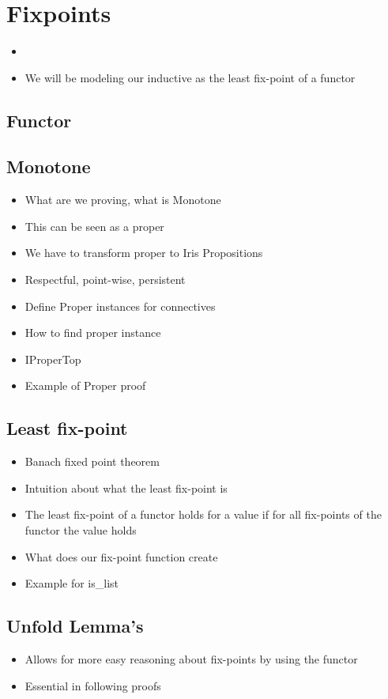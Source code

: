 \documentclass[thesis.tex]{subfiles}
\begin{document}
\chapter{Fixpoints}
\begin{itemize}
    \item
    \item We will be modeling our inductive as the least fix-point of a functor
\end{itemize}
\section{Functor}
\section{Monotone}
\begin{itemize}
    \item What are we proving, what is Monotone
    \item This can be seen as a proper
    \item We have to transform proper to Iris Propositions
    \item Respectful, point-wise, persistent
    \item Define Proper instances for connectives
    \item How to find proper instance
    \item IProperTop
    \item Example of Proper proof
\end{itemize}
\section{Least fix-point}
\begin{itemize}
    \item Banach fixed point theorem
    \item Intuition about what the least fix-point is
    \item The least fix-point of a functor holds for a value if for all fix-points of the functor the value holds
    \item What does our fix-point function create
    \item Example for is_list
\end{itemize}
\section{Unfold Lemma's}
\begin{itemize}
    \item Allows for more easy reasoning about fix-points by using the functor
    \item Essential in following proofs
\end{itemize}
\end{document}
